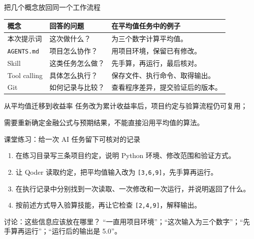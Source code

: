 \documentclass[9pt]{ctexbeamer}
\begin{document}
\begin{frame}{把几个概念放回同一个工作流程}
  \begin{tabular}{@{}p{}p{}p{}@{}}
    \toprule
    概念 & 回答的问题 & 在平均值任务中的例子 \\
    \midrule
    本次提示词 & 这次做什么？ & 为三个数字计算平均值。\\[7pt]
    \texttt{AGENTS.md} & 项目怎么协作？ & 用项目环境，保留已有修改。\\[7pt]
    Skill & 这类任务怎么做？ & 先手算，再运行，最后核对。\\[7pt]
    Tool calling & 具体怎么执行？ & 保存文件、执行命令、取得输出。\\[7pt]
    Git & 如何记录与比较？ & 查看程序差异，提交验证后的版本。\\
    \bottomrule
  \end{tabular}
  \begin{block}{从平均值迁移到收益率}
    任务改为累计收益率后，项目约定与验算流程仍可复用；\par
    需要重新确定金融公式与预期结果，不能直接沿用平均值的算法。
  \end{block}
\end{frame}

\begin{frame}{课堂练习：给一次 AI 任务留下可核对的记录}
  \begin{enumerate}
    \item 在练习目录写三条项目约定，说明 Python 环境、修改范围和验证方式。
    \item 让 Qoder 读取约定，把平均值输入改为 \texttt{[3,6,9]}，先手算再运行。
    \item 在执行记录中分别找到一次读取、一次修改和一次运行，并说明返回了什么。
    \item 按前述方式导入验算技能，再让它检查 \texttt{[2,4,9]}，解释输出。
  \end{enumerate}
  \begin{block}{讨论：这些信息应该放在哪里？}
    “一直用项目环境”；“这次输入为三个数字”；“先手算再运行”；“运行后的输出是 5.0”。
  \end{block}
\end{frame}
\end{document}
